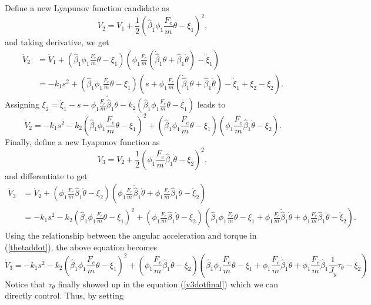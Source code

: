 Define a new Lyapunov function candidate as
\begin{equation}
V_2=V_1+\frac{1}{2}(\hat{\beta}_1\phi_1\frac{F_e}{m}\theta-\xi_1)^2,
\label{v2}
\end{equation}
and taking derivative, we get
\begin{align}
\dot{V}_2&=\dot{V}_1+(\hat{\beta}_1\phi_1\frac{F_e}{m}\theta-\xi_1)(\phi_1\frac{F_e}{m}(\dot{\hat{\beta}}_1\theta+\hat{\beta}_1\dot{\theta})-\dot{\xi}_1)
\\&=-k_1s^2+
(\hat{\beta}_1\phi_1\frac{F_e}{m}\theta-\xi_1)
(s+\phi_1\frac{F_e}{m}(\dot{\hat{\beta}}_1\theta+\hat{\beta}_1\dot{\theta})-\dot{\xi}_1+\xi_2-\xi_2).
\end{align}
Assigning $\xi_2=\dot{\xi}_1-s-\phi_1\frac{F_e}{m}\dot{\hat{\beta}}_1\theta-k_2(\hat{\beta}_1\phi_1\frac{F_e}{m}\theta-\xi_1)$ leads to
\begin{equation}
\dot{V}_2=-k_1s^2-k_2(\hat{\beta}_1\phi_1\frac{F_e}{m}\theta-\xi_1)^2+
(\hat{\beta}_1\phi_1\frac{F_e}{m}\theta-\xi_1)
(\phi_1\frac{F_e}{m}\hat{\beta}_1\dot{\theta}-\xi_2).
\label{v2dotfinal}
\end{equation}
Finally, define a new Lyapunov function as 
\begin{equation}
V_3=V_2+\frac{1}{2}(\phi_1\frac{F_e}{m}\hat{\beta}_1\dot{\theta}-\xi_2)^2,
\label{v3}
\end{equation}
and differentiate to get
\begin{align}
\dot{V}_3&=\dot{V}_2+
(\phi_1\frac{F_e}{m}\hat{\beta}_1\dot{\theta}-\xi_2)
(\phi_1\frac{F_e}{m}\dot{\hat{\beta}}_1\dot{\theta}+\phi_1\frac{F_e}{m}\hat{\beta}_1\ddot{\theta}-\dot{\xi}_2)
\\&=-k_1s^2-k_2(\hat{\beta}_1\phi_1\frac{F_e}{m}\theta-\xi_1)^2+(\phi_1\frac{F_e}{m}\hat{\beta}_1\dot{\theta}-\xi_2)
(\hat{\beta}_1\phi_1\frac{F_e}{m}\theta-\xi_1+\phi_1\frac{F_e}{m}\dot{\hat{\beta}}_1\dot{\theta}+\phi_1\frac{F_e}{m}\hat{\beta}_1\ddot{\theta}-\dot{\xi}_2).
\label{v3dot}
\end{align}
 Using the relationship between the angular acceleration and torque in (\ref{thetaddot}), the above equation becomes
\begin{equation}
\dot{V}_3=-k_1s^2-k_2(\hat{\beta}_1\phi_1\frac{F_e}{m}\theta-\xi_1)^2+(\phi_1\frac{F_e}{m}\hat{\beta}_1\dot{\theta}-\xi_2)
(\hat{\beta}_1\phi_1\frac{F_e}{m}\theta-\xi_1+\phi_1\frac{F_e}{m}\dot{\hat{\beta}}_1\dot{\theta}+\phi_1\frac{F_e}{m}\hat{\beta}_1\frac{1}{J_y}\tau_\theta-\dot{\xi}_2)
\label{v3dotfinal}
\end{equation}
Notice that $\tau_\theta$ finally showed up in the equation (\ref{v3dotfinal}) which we can directly control. Thus, by setting 
